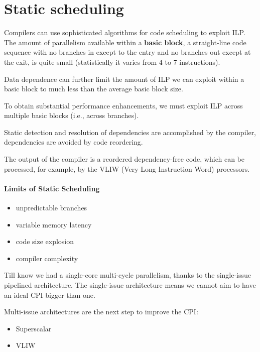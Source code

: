 
\section{Static scheduling}\label{sec:static-scheduling}
Compilers can use sophisticated algorithms for code
scheduling to exploit ILP\@.
The amount of parallelism available within a \textbf{basic block}, a straight-line code sequence with no branches in
except to the entry and no branches out except at the
exit, is quite small (statistically it varies from 4 to 7 instructions).

Data dependence can further limit the amount of ILP we
can exploit within a basic block to much less than the
average basic block size.

To obtain substantial performance enhancements, we
must exploit ILP across multiple basic blocks (i.e.,
across branches).

Static detection and resolution of dependencies are accomplished by the compiler, dependencies are avoided by code
reordering.

The output of the compiler is a reordered dependency-free code, which can be processed, for example, by the VLIW (Very
Long Instruction Word) processors.

\paragraph{Limits of Static Scheduling}
\begin{itemize}
    \item unpredictable branches
    \item variable memory latency
    \item code size explosion
    \item compiler complexity
\end{itemize}

Till know we had a single-core multi-cycle parallelism, thanks to the single-issue pipelined architecture.
The single-issue architecture means we cannot aim to have an ideal CPI bigger than one.

Multi-issue architectures are the next step to improve the CPI:
\begin{itemize}[noitemsep]
    \item Superscalar
    \item VLIW
\end{itemize}

